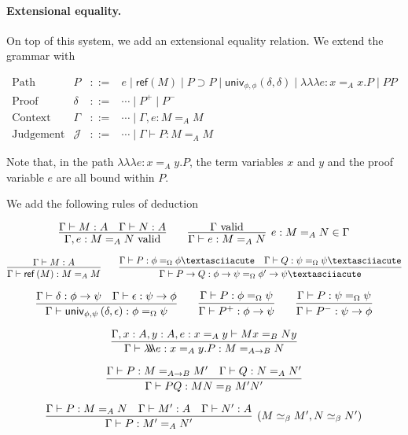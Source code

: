\documentclass{easychair}
\newcommand{\vald}{\ \mathrm{valid}}
\newcommand{\univ}[4]{\mathsf{univ}_{{#1},{#2}} \left( {#3} , {#4} \right)}
\newcommand{\triplelambda}{\lambda \!\! \lambda \!\! \lambda}
\newcommand{\reff}[1]{\mathsf{ref} \left( {#1} \right)}
\begin{document}
\paragraph{Extensional equality.}

On top of this system, we add an extensional equality relation.  We extend the grammar with

\[
\begin{array}{lrcl}
\text{Path} & P & ::= & e \mid \reff{M} \mid P \supset P \mid \univ{\phi}{\phi}{\delta}{\delta} \mid \triplelambda e : x =_A x . P \mid P P\\
\text{Proof} & \delta & ::= & \cdots \mid P^+ \mid P^- \\
\text{Context} & \Gamma & ::= & \cdots \mid \Gamma, e : M =_A M \\
\text{Judgement} & \mathcal{J} & ::= & \cdots \mid \Gamma \vdash P : M =_A M
\end{array}
\]

Note that, in the path $\triplelambda e : x =_A y . P$, the term variables $x$ and $y$ and the proof variable $e$ are all bound within $P$.

We add the following rules of deduction

\[ \infer{\Gamma, e : M =_A N \vald}{\Gamma \vdash M : A \quad \Gamma \vdash N : A}
\qquad
\infer[e : M =_A N \in \Gamma]{\Gamma \vdash e : M =_A N}{\Gamma \vald} \]

\[ \infer{\Gamma \vdash \reff{M} : M =_A M}{\Gamma \vdash M : A}
\qquad
\infer{\Gamma \vdash P \rightarrow Q : \phi \rightarrow \psi =_\Omega \phi' \rightarrow \psi´}{\Gamma \vdash P : \phi =_\Omega \phi´ \quad \Gamma \vdash Q : \psi =_\Omega \psi´} \]

\[ \infer{\Gamma \vdash \univ{\phi}{\psi}{\delta}{\epsilon} : \phi =_\Omega \psi}{\Gamma \vdash \delta : \phi \rightarrow \psi \quad \Gamma \vdash \epsilon : \psi \rightarrow \phi} 
\qquad
\infer{\Gamma \vdash P^+ : \phi \rightarrow \psi}{\Gamma \vdash P : \phi =_\Omega \psi}
\qquad
\infer{\Gamma \vdash P^- : \psi \rightarrow \phi}{\Gamma \vdash P : \psi =_\Omega \psi} \]

\[ \infer{\Gamma \vdash \triplelambda e : x =_A y . P : M =_{A \rightarrow B} N}{\Gamma, x : A, y : A, e : x =_A y \vdash M x =_B N y} \]

\[ \infer{\Gamma \vdash PQ : MN =_B M' N'}{\Gamma \vdash P : M =_{A \rightarrow B} M' \quad \Gamma \vdash Q : N =_A N'} \]

\[ \infer[(M \simeq_\beta M', N \simeq_\beta N')]{\Gamma \vdash P : M' =_A N'}{\Gamma \vdash P : M =_A N \quad \Gamma \vdash M' : A \quad \Gamma \vdash N' : A} \]
\end{document}
